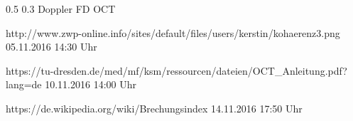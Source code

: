 \documentclass[german, %
parskip=full, %
bibliography=totoc, %
]{scrartcl}
\makeatletter
\renewcommand\subsection{\@startsection 
   {subsection}{2}{0mm}%
   {0.5\baselineskip}%
   {0.3\baselineskip}%
   {\bfseries\sffamily\large}%
   }
\makeatother
\begin{document}
\subsection{Doppler FD OCT}


\begin{thebibliography}{9}

  http://www.zwp-online.info/sites/default/files/users/kerstin/kohaerenz3.png
	05.11.2016
	14:30 Uhr

  https://tu-dresden.de/med/mf/ksm/ressourcen/dateien/OCT\_Anleitung.pdf?lang=de
	10.11.2016
	14:00 Uhr
	
  https://de.wikipedia.org/wiki/Brechungsindex
	14.11.2016
	17:50 Uhr

\end{thebibliography}
\end{document}
